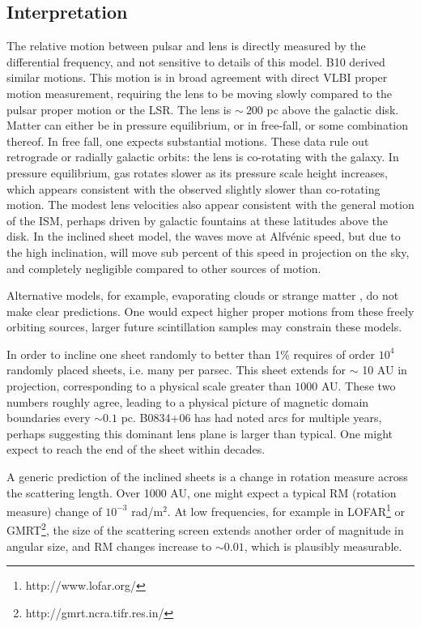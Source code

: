\documentclass[useAMS,usenatbib]{mn2e}
\begin{document}
\subsection{Interpretation}

The relative motion between pulsar and lens is directly measured by
the differential frequency, and not sensitive to details of this
model. B10 derived similar motions.  This
motion is in broad agreement with direct VLBI proper motion
measurement, requiring the lens to be moving slowly compared to the
pulsar proper motion or the LSR.  The lens is $\sim~200$ pc above the
galactic disk.  Matter can either be in pressure equilibrium, or in
free-fall, or some combination thereof.  In free fall, one expects
substantial motions.  These data rule out retrograde or radially
galactic orbits: the lens is co-rotating with the galaxy.  In pressure
equilibrium, gas rotates slower as its pressure scale height
increases, which appears consistent with the observed slightly slower
than co-rotating motion.  The modest lens velocities also appear
consistent with the general motion of the ISM, perhaps driven by
galactic fountains \citep{1976ApJ...205..762S} at these latitudes above
the disk.  In the inclined sheet model, the waves move at Alfv\'enic
speed, but due to the high inclination, will move sub percent of this
speed in projection on the sky, and completely negligible compared to
other sources of motion.

Alternative models, for example, evaporating
clouds \citep{1998ApJ...498L.125W} or strange
matter \citep{2013PhLB..727..357P}, do not make clear predictions.  One
would expect higher proper motions from these freely orbiting sources,
larger future scintillation samples may constrain these models.

In order to incline one sheet randomly to better than 1\% requires of
order $10^4$ randomly placed sheets, i.e. many per parsec.  This sheet
extends for $\sim$ 10 AU in projection, corresponding to a physical
scale greater than $1000$ AU.   These two numbers roughly agree,
leading to a physical picture of magnetic domain boundaries every
$\sim 0.1$ pc.  B0834+06 has had noted arcs for multiple years,
perhaps suggesting this dominant lens plane is larger than typical.
One might expect to reach the end of the sheet within decades.

A generic prediction of the inclined sheets is a change in rotation
measure across the scattering length.  Over 1000 AU, one might expect
a typical RM (rotation measure) change of $10^{-3}$ rad/m$^2$.  At low frequencies, for
example in LOFAR\footnote{http://www.lofar.org/} or GMRT\footnote{http://gmrt.ncra.tifr.res.in/}, the size of the scattering screen extends
another order of magnitude in angular size, and RM changes increase to
$\sim 0.01$, which is plausibly measurable.
\end{document}

